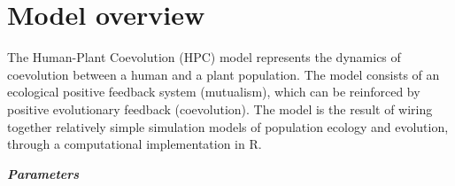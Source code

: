 \documentclass[]{book}
\begin{document}
\hypertarget{model-overview}{%
\chapter*{Model overview}\label{model-overview}}

The Human-Plant Coevolution (HPC) model represents the dynamics of coevolution between a human and a plant population. The model consists of an ecological positive feedback system (mutualism), which can be reinforced by positive evolutionary feedback (coevolution). The model is the result of wiring together relatively simple simulation models of population ecology and evolution, through a computational implementation in R.

\newpage

\textbf{\emph{Parameters}}
\end{document}
